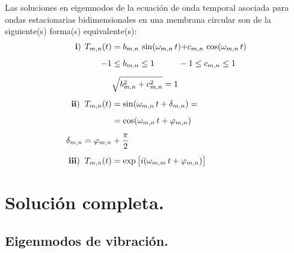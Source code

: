 Las soluciones en eigenmodos de la ecuación de onda temporal asociada para ondas estacionarias bidimensionales en una membrana circular son de la siguiente(s) forma(s) equivalente(s):
\begin{align*}
\mathbf{i)} \hspace{0.15cm} T_{m,n} (t) &= b_{m,n} \, \sin (\omega_{m,n} \, t) {+} c_{m,n} \, \cos (\omega_{m,n} \, t) \\[0.5em]
-1 &\leq b_{m,n} \leq 1 \hspace{1cm} -1 \leq c_{m,n} \leq 1 \\[0.5em]
&\sqrt{b_{m,n}^{2} + c_{m,n}^{2}} = 1 \\[0.5em]
\mathbf{ii)} \hspace{0.2cm} T_{m,n} (t) &= \sin (\omega_{m,n} \, t + \delta_{m,n}) = \\[0.5em] 
&= \cos(\omega_{m,n} \, t + \varphi_{m,n}) \\[0.5em] 
\delta_{m,n} = \varphi_{m,n} &+ \dfrac{\pi}{2} \\[0.5em] 
\mathbf{iii)} \hspace{0.2cm} T_{m,n} (t) &= \exp\big[ i(\omega_{m,m} \, t + \varphi_{m,n}) \big]
\end{align*}

\section{Solución completa.}
\subsection{Eigenmodos de vibración.}

